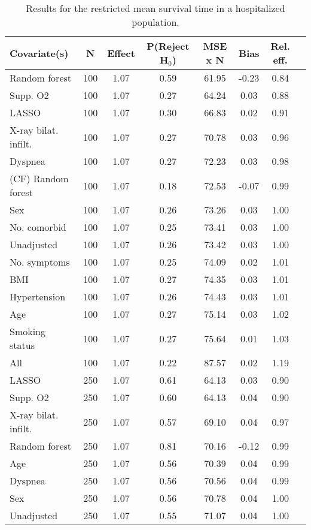 \documentclass{article}
\begin{document}
{\tabcolsep=6pt  %
\begin{longtable}{lccccccc}
\caption{Results for the restricted mean survival time in a hospitalized population.} \\
Covariate(s) & N & Effect & P(Reject H$_0$) & MSE x N & Bias & Rel. eff.\\ \midrule
Random forest & 100 & 1.07 & 0.59 & 61.95 & -0.23 & 0.84 \\ 
Supp. O2 & 100 & 1.07 & 0.27 & 64.24 &  0.03 & 0.88 \\ 
LASSO & 100 & 1.07 & 0.30 & 66.83 &  0.02 & 0.91 \\ 
X-ray bilat. infilt. & 100 & 1.07 & 0.27 & 70.78 &  0.03 & 0.96 \\ 
Dyspnea & 100 & 1.07 & 0.27 & 72.23 &  0.03 & 0.98 \\ 
(CF) Random forest & 100 & 1.07 & 0.18 & 72.53 & -0.07 & 0.99 \\ 
Sex & 100 & 1.07 & 0.26 & 73.26 &  0.03 & 1.00 \\ 
No. comorbid & 100 & 1.07 & 0.25 & 73.41 &  0.03 & 1.00 \\ 
Unadjusted & 100 & 1.07 & 0.26 & 73.42 &  0.03 & 1.00 \\ 
No. symptoms & 100 & 1.07 & 0.25 & 74.09 &  0.02 & 1.01 \\ 
BMI & 100 & 1.07 & 0.27 & 74.35 &  0.03 & 1.01 \\ 
Hypertension & 100 & 1.07 & 0.26 & 74.43 &  0.03 & 1.01 \\ 
Age & 100 & 1.07 & 0.27 & 75.14 &  0.03 & 1.02 \\ 
Smoking status & 100 & 1.07 & 0.27 & 75.64 &  0.01 & 1.03 \\ 
All & 100 & 1.07 & 0.22 & 87.57 &  0.02 & 1.19 \\ \midrule() 
LASSO & 250 & 1.07 & 0.61 & 64.13 &  0.03 & 0.90 \\ 
Supp. O2 & 250 & 1.07 & 0.60 & 64.13 &  0.04 & 0.90 \\ 
X-ray bilat. infilt. & 250 & 1.07 & 0.57 & 69.10 &  0.04 & 0.97 \\ 
Random forest & 250 & 1.07 & 0.81 & 70.16 & -0.12 & 0.99 \\ 
Age & 250 & 1.07 & 0.56 & 70.39 &  0.04 & 0.99 \\ 
Dyspnea & 250 & 1.07 & 0.56 & 70.56 &  0.04 & 0.99 \\ 
Sex & 250 & 1.07 & 0.56 & 70.78 &  0.04 & 1.00 \\ 
Unadjusted & 250 & 1.07 & 0.55 & 71.07 &  0.04 & 1.00 \\ 

\end{longtable}}
\end{document}
